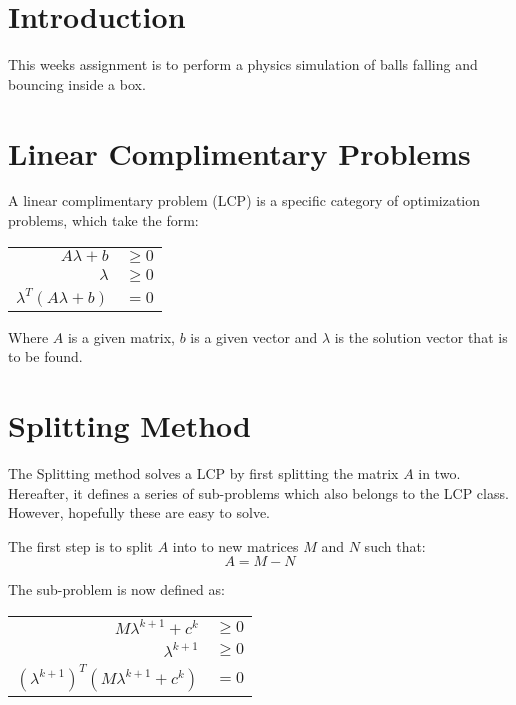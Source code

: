 \documentclass[10pt,oneside,a4paper,final,english]{memoir}
\begin{document}




\maketitle
\newpage

\frontmatter
\tableofcontents
\newpage

\section{Introduction}
This weeks assignment is to perform a physics simulation of balls
falling and bouncing inside a box.


\section{Linear Complimentary Problems}
A linear complimentary problem (LCP) is a specific category of
optimization problems, which take the form:\\

\begin{center}\begin{tabular}{rl}
$A\lambda + b$ & $\geq 0$ \\
$\lambda$ & $\geq 0$\\
$\lambda^T (A\lambda + b)$ & $= 0$
\end{tabular}\end{center}

Where $A$ is a given matrix, $b$ is a given vector and $\lambda$ is
the solution vector that is to be found.


\section{Splitting Method}
\label{splitting}
The Splitting method solves a LCP by first splitting the matrix $A$ in
two. Hereafter, it defines a series of sub-problems which also belongs
to the LCP class. However, hopefully these are easy to solve.

The first step is to split $A$ into to new matrices $M$ and $N$ such
that:
\[ A = M - N \]

The sub-problem is now defined as:
\begin{center}\begin{tabular}{rl}
$M\lambda^{k+1} + c^k$ & $\geq 0$ \\
$\lambda^{k+1}$ & $\geq 0$\\
$(\lambda^{k+1})^T (M\lambda^{k+1} + c^k)$ & $= 0$
\end{tabular}\end{center}
\end{document}
